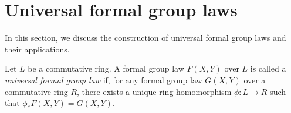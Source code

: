 

\section{Universal formal group laws}

In this section, we discuss the construction of universal formal group laws and their applications.

\begin{definition}
Let $L$ be a commutative ring.
A formal group law $F(X,Y)$ over $L$ is called a \emph{universal formal group law} if, for any
formal group law $G(X,Y)$ over a commutative ring $R$, there exists a unique ring homomorphism
$\phi : L \to R$ such that $\phi_*F(X,Y) = G(X,Y)$.
\end{definition}

